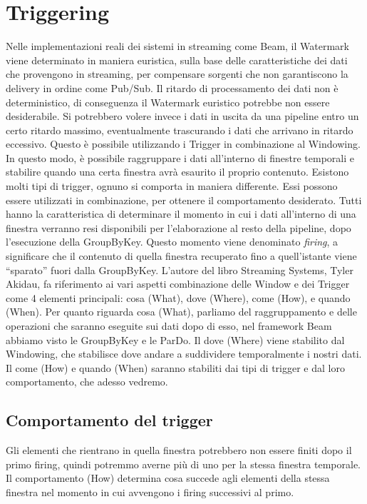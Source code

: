 \section{Triggering}\label{trigger}
Nelle implementazioni reali dei sistemi in streaming come Beam, il Watermark viene determinato in maniera euristica, sulla base delle caratteristiche dei dati che provengono in streaming, per compensare sorgenti che non garantiscono la delivery in ordine come Pub/Sub. Il ritardo di processamento dei dati non è deterministico, di conseguenza il Watermark euristico potrebbe non essere desiderabile. Si potrebbero volere invece i dati in uscita da una pipeline entro un certo ritardo massimo, eventualmente trascurando i dati che arrivano in ritardo eccessivo. Questo è possibile utilizzando i Trigger in combinazione al Windowing. In questo modo, è possibile raggruppare i dati all’interno di finestre temporali e stabilire quando una certa finestra avrà esaurito il proprio contenuto. Esistono molti tipi di trigger, ognuno si comporta in maniera differente. Essi possono essere utilizzati in combinazione, per ottenere il comportamento desiderato. Tutti hanno la caratteristica di determinare il momento in cui i dati all’interno di una finestra verranno resi disponibili per l’elaborazione al resto della pipeline, dopo l’esecuzione della GroupByKey. Questo momento viene denominato \textit{firing}, a significare che il contenuto di quella finestra recuperato fino a quell’istante viene “sparato” fuori dalla GroupByKey.
L’autore del libro Streaming Systems, Tyler Akidau, fa riferimento ai vari aspetti combinazione delle Window e dei Trigger come 4 elementi principali: cosa (What), dove (Where), come (How), e quando (When). Per quanto riguarda cosa (What), parliamo del raggruppamento e delle operazioni che saranno eseguite sui dati dopo di esso, nel framework Beam abbiamo visto le GroupByKey e le ParDo. Il dove (Where) viene stabilito dal Windowing, che stabilisce dove andare a suddividere temporalmente i nostri dati. Il come (How) e quando (When) saranno stabiliti dai tipi di trigger e dal loro comportamento, che adesso vedremo.
\subsection{Comportamento del trigger}
Gli elementi che rientrano in quella finestra potrebbero non essere finiti dopo il primo firing, quindi potremmo averne più di uno per la stessa finestra temporale. Il comportamento (How) determina cosa succede agli elementi della stessa finestra nel momento in cui avvengono i firing successivi al primo.
